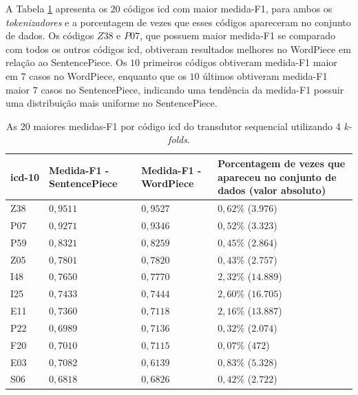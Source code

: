  A Tabela \ref{table:xfmr_xfmr_statistics_details} apresenta os 20 códigos \gls{icd} com maior medida-F1, para ambos os \textit{tokenizadores} e a porcentagem de vezes que esses códigos apareceram no conjunto de dados. Os códigos $Z38$ e $P07$, que possuem maior medida-F1 se comparado com todos os outros códigos \gls{icd}, obtiveram resultados melhores no WordPiece em relação ao SentencePiece. Os $10$ primeiros códigos obtiveram medida-F1 maior em $7$ casos no WordPiece, enquanto que os $10$ últimos obtiveram medida-F1 maior $7$ casos no SentencePiece, indicando uma tendência da medida-F1 possuir uma distribuição mais uniforme no SentencePiece.
\begin{table}[ht!]
    \caption{As 20 maiores medidas-F1 por código \gls{icd} do transdutor sequencial \xfmrxfmr{} utilizando 4 \textit{k-folds}.}
    \label{table:xfmr_xfmr_statistics_details}
    \centering
    \begin{tabular}{
        >{\centering\arraybackslash}m{} | >{\centering\arraybackslash}m{} | >{\centering\arraybackslash}m{} | >{\centering\arraybackslash}m{}}
        \hline
        \gls{icd}-10 & Medida-F1 - SentencePiece & Medida-F1 - WordPiece & Porcentagem de vezes que apareceu no conjunto de dados (valor absoluto)  \\
        \hline
        Z38 & $0,9511$ & $0,9527$ & $0,62\%$ ($3.976$) \\
        \hline
        P07 & $0,9271$ & $0,9346$ & $0,52\%$ ($3.323$) \\
        \hline
        P59 & $0,8321$ & $0,8259$ & $0,45\%$ ($2.864$) \\
        \hline
        Z05 & $0,7801$ & $0,7820$ & $0,43\%$ ($2.757$) \\
        \hline
        I48 & $0,7650$ & $0,7770$ & $2,32\%$ ($14.889$) \\
        \hline
        I25 & $0,7433$ & $0,7444$  & $2,60\%$ ($16.705$) \\
        \hline
        E11 & $0,7360$ & $0,7118$ & $2,16\%$ ($13.887$) \\
        \hline
        P22 & $0,6989$ & $0,7136$ & $0,32\%$ ($2.074$) \\
        \hline
        F20 & $0,7010$ & $0,7115$ & $0,07\%$ ($472$) \\
        \hline
        E03 & $0,7082$ & $0,6139$ & $0,83\%$ ($5.328$) \\
        \hline
        S06 & $0,6818$ & $0,6826$ & $0,42\%$ ($2.722$) \\

\end{tabular}
\end{table}

